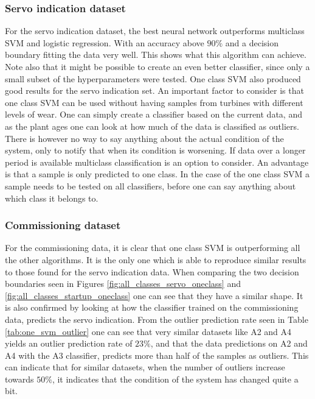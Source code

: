         \subsubsection{Servo indication dataset}
            For the servo indication dataset, the best neural network outperforms multiclass SVM and logistic regression. With an accuracy above $90\%$ and a decision boundary fitting the data very well. This shows what this algorithm can achieve. Note also that it might be possible to create an even better classifier, since only a small subset of the hyperparameters were tested. One class SVM also produced good results for the servo indication set. An important factor to consider is that one class SVM can be used without having samples from turbines with different levels of wear. One can simply create a classifier based on the current data, and as the plant ages one can look at how much of the data is classified as outliers. There is however no way to say anything about the actual condition of the system, only to notify that when its condition is worsening. If data over a longer period is available multiclass classification is an option to consider. An advantage is that a sample is only predicted to one class. In the case of the one class SVM a sample needs to be tested on all classifiers, before one can say anything about which class it belongs to. 
            
            
        \subsubsection{Commissioning dataset}
            For the commissioning data, it is clear that one class SVM is outperforming all the other algorithms. It is the only one which is able  to reproduce similar results to those found for the servo indication data. When comparing the two decision boundaries seen in Figures \ref{fig:all_classes_servo_oneclass} and \ref{fig:all_classes_startup_oneclass} one can see that they have a similar shape. It is also confirmed by looking at how the classifier trained on the commissioning data, predicts the servo indication. From the outlier prediction rate seen in Table \ref{tab:one_svm_outlier} one can see that very similar datasets like A2 and A4 yields an outlier prediction rate of $23\%$, and that the data predictions on A2 and A4 with the A3 classifier, predicts more than half of the samples as outliers. This can indicate that for similar datasets, when the number of outliers increase towards $50\%$, it indicates that the condition of the system has changed quite a bit.
            

